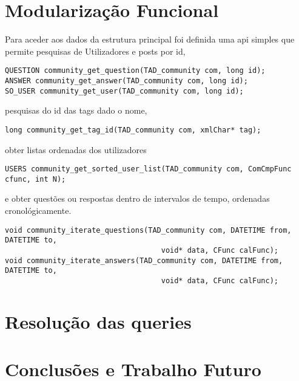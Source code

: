 \documentclass[10pt,a4paper]{report}
\begin{document}
\chapter{Modularização Funcional}
    Para aceder aos dados da estrutura principal foi definida uma api simples
    que permite pesquisas de Utilizadores e posts por id,
    \begin{verbatim}
QUESTION community_get_question(TAD_community com, long id);
ANSWER community_get_answer(TAD_community com, long id);
SO_USER community_get_user(TAD_community com, long id);
    \end{verbatim}
    pesquisas do id das tags dado o nome,
    \begin{verbatim}
long community_get_tag_id(TAD_community com, xmlChar* tag);
    \end{verbatim}
    obter listas ordenadas dos utilizadores
    \begin{verbatim}
USERS community_get_sorted_user_list(TAD_community com, ComCmpFunc cfunc, int N);
    \end{verbatim}
    e obter questões ou respostas dentro de intervalos de tempo,
    ordenadas cronológicamente.
    \begin{verbatim}
void community_iterate_questions(TAD_community com, DATETIME from, DATETIME to,
                                    void* data, CFunc calFunc);
void community_iterate_answers(TAD_community com, DATETIME from, DATETIME to,
                                    void* data, CFunc calFunc);
    \end{verbatim}

\chapter{Resolução das queries}
    
\chapter{Conclusões e Trabalho Futuro}
\end{document}
